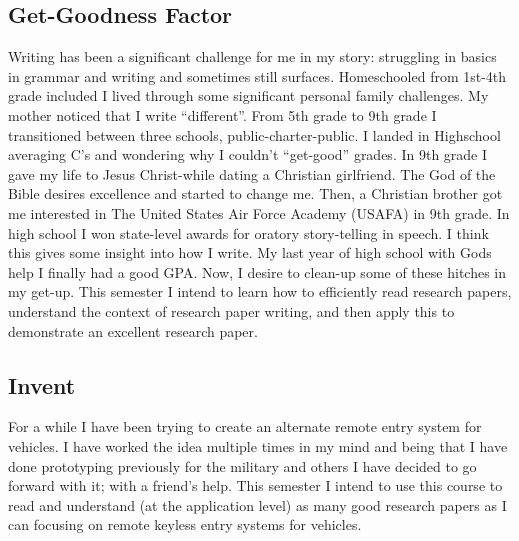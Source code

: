 \documentclass[conference]{journal}
\begin{document}
\subsection{Get-Goodness Factor}
Writing has been a significant challenge for me in my story: struggling in basics in grammar and writing and sometimes still surfaces. Homeschooled from 1st-4th grade included I lived through some significant personal family challenges. My mother noticed that I write “different”. From 5th grade to 9th grade I transitioned between three schools, public-charter-public. I landed in Highschool averaging C's and wondering why I couldn’t “get-good” grades. In 9th grade I gave my life to Jesus Christ-while dating a Christian girlfriend. The God of the Bible desires excellence and started to change me. Then, a Christian brother got me interested in The United States Air Force Academy (USAFA) in 9th grade. In high school I won state-level awards for oratory story-telling in speech. I think this gives some insight into how I write. My last year of high school with Gods help I finally had a good GPA. Now, I desire to clean-up some of these hitches in my get-up. This semester I intend to learn how to efficiently read research papers, understand the context of research paper writing, and then apply this to demonstrate an excellent research paper.
\subsection{Invent}
For a while I have been trying to create an alternate remote entry system for vehicles. I have worked the idea multiple times in my mind and being that I have done prototyping previously for the military and others I have decided to go forward with it; with a friend’s help. This semester I intend to use this course to read and understand (at the application level) as many good research papers as I can focusing on remote keyless entry systems for vehicles.
\end{document}
